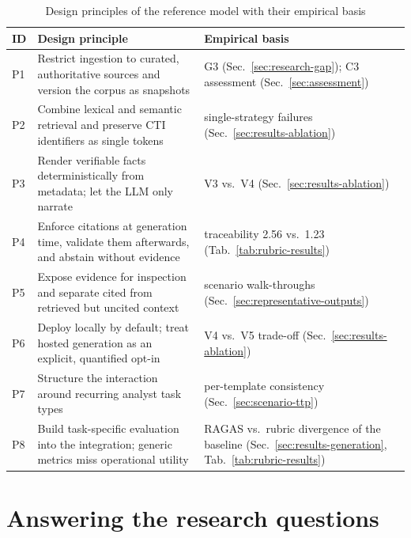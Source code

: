\begin{table}[H]
    \centering
    \small
    \begin{tabular}{lp{}p{}}
        \toprule
        \textbf{ID} & \textbf{Design principle} & \textbf{Empirical basis} \\
        \midrule
        P1 & Restrict ingestion to curated, authoritative sources and
             version the corpus as snapshots &
             G3 (Sec.~\ref{sec:research-gap}); C3 assessment
             (Sec.~\ref{sec:assessment}) \\
        P2 & Combine lexical and semantic retrieval and preserve CTI
             identifiers as single tokens &
             single-strategy failures
             (Sec.~\ref{sec:results-ablation}) \\
        P3 & Render verifiable facts deterministically from metadata;
             let the LLM only narrate &
             V3 vs.\ V4 (Sec.~\ref{sec:results-ablation}) \\
        P4 & Enforce citations at generation time, validate them
             afterwards, and abstain without evidence &
             traceability 2.56 vs.\ 1.23
             (Tab.~\ref{tab:rubric-results}) \\
        P5 & Expose evidence for inspection and separate cited from
             retrieved but uncited context &
             scenario walk-throughs
             (Sec.~\ref{sec:representative-outputs}) \\
        P6 & Deploy locally by default; treat hosted generation as an
             explicit, quantified opt-in &
             V4 vs.\ V5 trade-off
             (Sec.~\ref{sec:results-ablation}) \\
        P7 & Structure the interaction around recurring analyst task
             types &
             per-template consistency
             (Sec.~\ref{sec:scenario-ttp}) \\
        P8 & Build task-specific evaluation into the integration;
             generic metrics miss operational utility &
             RAGAS vs.\ rubric divergence of the baseline
             (Sec.~\ref{sec:results-generation},
             Tab.~\ref{tab:rubric-results}) \\
        \bottomrule
    \end{tabular}
    \caption{Design principles of the reference model with their
             empirical basis}
    \label{tab:principles}
\end{table}

\section{Answering the research questions}
\label{sec:rq-answers}
\enlargethispage{3\baselineskip}

